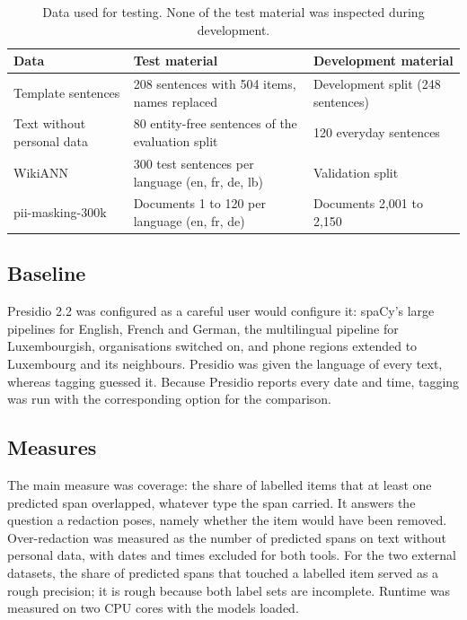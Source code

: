 \documentclass[10pt,a4paper,twocolumn]{article}
\begin{document}
\begin{table}[t]
\centering
\small
\caption{Data used for testing. None of the test material was inspected during development.}
\label{tab:data}
\begin{tabularx}{\textwidth}{@{}lXl@{}}
\toprule
Data & Test material & Development material \\
\midrule
Template sentences & 208 sentences with 504 items, names replaced & Development split (248 sentences) \\
Text without personal data & 80 entity-free sentences of the evaluation split & 120 everyday sentences \\
WikiANN & 300 test sentences per language (en, fr, de, lb) & Validation split \\
pii-masking-300k & Documents 1 to 120 per language (en, fr, de) & Documents 2{,}001 to 2{,}150 \\
\bottomrule
\end{tabularx}
\end{table}

\subsection{Baseline}

Presidio 2.2 was configured as a careful user would configure it: spaCy's large pipelines for
English, French and German, the multilingual pipeline for Luxembourgish, organisations switched on,
and phone regions extended to Luxembourg and its neighbours. Presidio was given the language of
every text, whereas tagging guessed it. Because Presidio reports every date and time, tagging was
run with the corresponding option for the comparison.

\subsection{Measures}

The main measure was coverage: the share of labelled items that at least one predicted span
overlapped, whatever type the span carried. It answers the question a redaction poses, namely
whether the item would have been removed. Over-redaction was measured as the number of predicted
spans on text without personal data, with dates and times excluded for both tools. For the two
external datasets, the share of predicted spans that touched a labelled item served as a rough
precision; it is rough because both label sets are incomplete. Runtime was measured on two CPU
cores with the models loaded.
\end{document}
